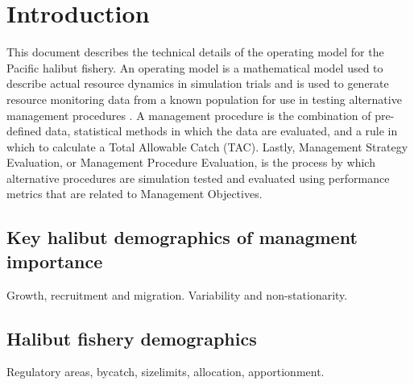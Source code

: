 
\section{Introduction} %
\label{sec:introduction}
This document describes the technical details of the operating model for the Pacific halibut fishery.  An operating model is a mathematical model used to describe actual resource dynamics in simulation trials and is used to generate resource monitoring data from a known population for use in testing alternative management procedures \citep{Rademeyer2007}.  A management procedure is the combination of pre-defined data, statistical methods in which the data are evaluated, and a rule in which to calculate a Total Allowable Catch (TAC).  Lastly, Management Strategy Evaluation, or Management Procedure Evaluation, is the process by which alternative procedures are simulation tested and evaluated using performance metrics that are related to Management Objectives.



\subsection{Key halibut demographics of managment importance} %
\label{sub:key_halibut_demographics_of_managment_importance}
	Growth, recruitment and migration. Variability and non-stationarity.


\subsection{Halibut fishery demographics} %
\label{sub:halibut_fishery_demographics}
	Regulatory areas, bycatch, sizelimits, allocation, apportionment.





